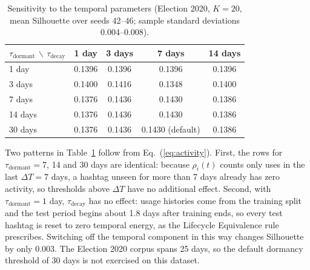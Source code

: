 \documentclass[pdflatex,sn-mathphys-num]{sn-jnl}%
\begin{document}
\begin{table}[t]
\centering
\caption{Sensitivity to the temporal parameters (Election 2020, $K=20$, mean Silhouette over seeds 42--46; sample standard deviations 0.004--0.008).}
\label{tab:tau}
\begin{tabular}{lcccc}
\toprule
$\tau_{\text{dormant}}$ $\backslash$ $\tau_{\text{decay}}$ & 1 day & 3 days & 7 days & 14 days \\
\midrule
1 day   & 0.1396 & 0.1396 & 0.1396 & 0.1396 \\
3 days  & 0.1400 & 0.1416 & 0.1348 & 0.1400 \\
7 days  & 0.1376 & 0.1436 & 0.1430 & 0.1386 \\
14 days & 0.1376 & 0.1436 & 0.1430 & 0.1386 \\
30 days & 0.1376 & 0.1436 & 0.1430 (default) & 0.1386 \\
\bottomrule
\end{tabular}
\end{table}

Two patterns in Table~\ref{tab:tau} follow from Eq.~(\ref{eq:activity}). First, the rows for $\tau_{\text{dormant}} = 7$, 14 and 30 days are identical: because $\rho_i(t)$ counts only uses in the last $\Delta T = 7$ days, a hashtag unseen for more than 7 days already has zero activity, so thresholds above $\Delta T$ have no additional effect. Second, with $\tau_{\text{dormant}} = 1$ day, $\tau_{\text{decay}}$ has no effect: usage histories come from the training split and the test period begins about 1.8 days after training ends, so every test hashtag is reset to zero temporal energy, as the Lifecycle Equivalence rule prescribes. Switching off the temporal component in this way changes Silhouette by only 0.003. The Election 2020 corpus spans 25 days, so the default dormancy threshold of 30 days is not exercised on this dataset.
\end{document}
